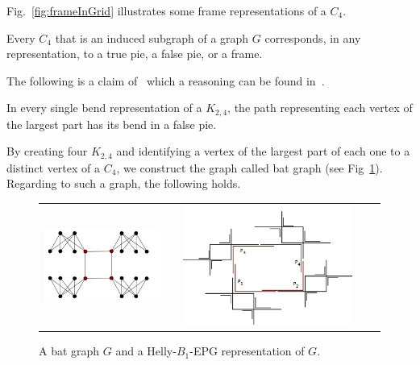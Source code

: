 Fig.~\ref{fig:frameInGrid} illustrates some frame representations of a $C_4$.






\begin{lemma}\label{lem:representacaoC4}
Every  $C_4$ that is an induced subgraph of a graph $ G $ corresponds, in any representation, to a true pie, a false pie, or a frame.
\end{lemma}

The following is a claim of~\cite{heldt2014} which a reasoning can be found in~\cite{Asinowski2009}.

\begin{lemma}\label{fact:k24facts}
In every single bend representation of a $K_{2,4}$, the path representing each vertex of the largest part has its bend in a false pie.
\end{lemma} %

By creating four $K_{2,4}$ and identifying a vertex of the largest part of each one to a distinct vertex of a $C_4$, we construct the graph called bat graph (see Fig~\ref{fig:grafoQ}). Regarding to such a graph, the following holds.

\begin{figure}[htb]
  \centering
  \begin{tabular}{c c c c c }
    \includegraphics[width=5.5cm]{./img/Qexemplo}    
    & &
   \includegraphics[width=8cm]{./img/representationQ}
  \end{tabular}
  \caption{A bat graph $G$ and a Helly-$B_1$-EPG representation of $G$.}\label{fig:grafoQ}
\end{figure} 

